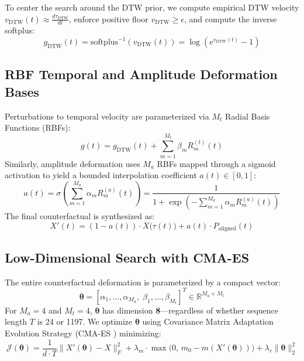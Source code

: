 \documentclass[11pt,a4paper]{report}
\begin{document}
To center the search around the DTW prior, we compute empirical DTW velocity $v_{\text{DTW}}(t) \approx \frac{d\tau_{\text{DTW}}}{dt}$, enforce positive floor $v_{\text{DTW}} \ge \epsilon$, and compute the inverse softplus:
\begin{equation}
    g_{\text{DTW}}(t) = \text{softplus}^{-1}(v_{\text{DTW}}(t)) = \log(e^{v_{\text{DTW}}(t)} - 1)
\end{equation}

\subsection{RBF Temporal and Amplitude Deformation Bases}
Perturbations to temporal velocity are parameterized via $M_t$ Radial Basis Functions (RBFs):
\begin{equation}
    g(t) = g_{\text{DTW}}(t) + \sum_{m=1}^{M_t} \beta_m R_m^{(t)}(t)
\end{equation}
Similarly, amplitude deformation uses $M_a$ RBFs mapped through a sigmoid activation to yield a bounded interpolation coefficient $a(t) \in [0, 1]$:
\begin{equation}
    a(t) = \sigma\left(\sum_{m=1}^{M_a} \alpha_m R_m^{(a)}(t)\right) = \frac{1}{1 + \exp\left(-\sum_{m=1}^{M_a} \alpha_m R_m^{(a)}(t)\right)}
\end{equation}
The final counterfactual is synthesized as:
\begin{equation}
    X'(t) = (1 - a(t)) \cdot X\big(\tau(t)\big) + a(t) \cdot P_{\text{aligned}}(t)
\end{equation}

\subsection{Low-Dimensional Search with CMA-ES}
The entire counterfactual deformation is parameterized by a compact vector:
\begin{equation}
    \boldsymbol{\theta} = [\alpha_1, \dots, \alpha_{M_a}, \; \beta_1, \dots, \beta_{M_t}]^T \in \mathbb{R}^{M_a + M_t}
\end{equation}
For $M_a = 4$ and $M_t = 4$, $\boldsymbol{\theta}$ has dimension \textbf{8}—regardless of whether sequence length $T$ is 24 or 1197. We optimize $\boldsymbol{\theta}$ using Covariance Matrix Adaptation Evolution Strategy (CMA-ES \cite{hansen2006cma}) minimizing:
\begin{equation}
    \mathcal{J}(\boldsymbol{\theta}) = \frac{1}{d \cdot T} \|X'(\boldsymbol{\theta}) - X\|_F^2 + \lambda_m \cdot \max\big(0, \, m_0 - m(X'(\boldsymbol{\theta}))\big) + \lambda_r \|\boldsymbol{\theta}\|_2^2
\end{equation}
\end{document}
